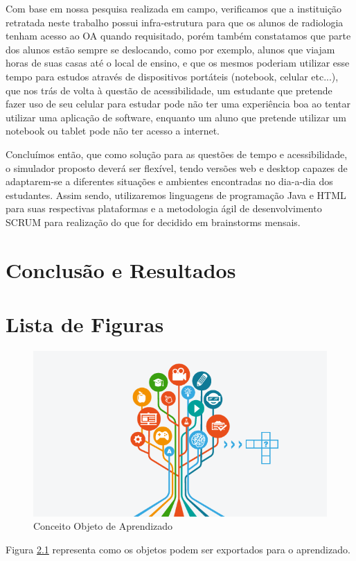 \documentclass[12pt,openright,oneside,a4paper,english,french,spanish,brazil]{unifil}
\begin{document}
Com base em nossa pesquisa realizada em campo, verificamos que a instituição retratada neste trabalho possui infra-estrutura para que os alunos de radiologia tenham acesso ao OA quando requisitado, porém também constatamos que parte dos alunos estão sempre se deslocando, como por exemplo, alunos que viajam horas de suas casas até o local de ensino, e que os mesmos poderiam utilizar esse tempo para estudos através de dispositivos portáteis (notebook, celular etc...), que nos trás de volta à questão de acessibilidade, um estudante que pretende fazer uso de seu celular para estudar pode não ter uma experiência boa ao tentar utilizar uma aplicação de software, enquanto um aluno que pretende utilizar um notebook ou tablet pode não ter acesso a internet.

Concluímos então, que como solução para as questões de tempo e acessibilidade, o simulador proposto deverá ser flexível, tendo versões web e desktop capazes de adaptarem-se a diferentes situações e ambientes encontradas no dia-a-dia dos estudantes. Assim sendo, utilizaremos linguagens de programação Java e HTML para suas respectivas plataformas e a metodologia ágil de desenvolvimento SCRUM para realização do que for decidido em brainstorms mensais.


\chapter {Conclusão e Resultados}

\chapter{Lista de Figuras}

\begin{figure}[htb]
	\centering
	\includegraphics[scale=0.5]{images/arvore.png}
	\caption{Conceito Objeto de Aprendizado}
	\label{img:arvore}
\end{figure}
Figura \ref{img:arvore} representa como os objetos podem ser exportados para o aprendizado.
\end{document}
